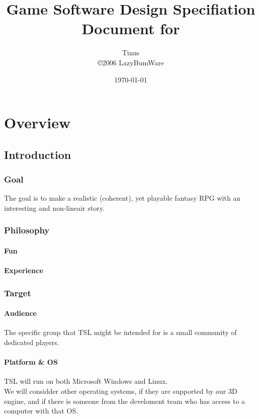 \documentclass[a4paper]{report}
\title{
	Game Software Design Specifiation Document for \\ 
	\nadruk{The Scattered Lands}
}
\author{
	Tinus \\
	\copyright 2006 LazyBumWare
}
\date{\today}
\begin{document}
\maketitle
\tableofcontents

\part{Overview}

	\chapter{Introduction}

		\section{Goal}

			The goal is to make a realistic (coherent), yet playable fantasy RPG with an interesting and non-lineair story.

		\section{Philosophy}

			\subsection{Fun}

			\subsection{Experience}

		\section{Target}

			\subsection{Audience}

				The specific group that TSL might be intended for is a small community of dedicated players.

			\subsection{Platform \& OS}

			TSL will run on both Microsoft Windows and Linux. \\
			We will considder other operating systems, if they are supported by our 3D engine, and if there is someone from the develoment team who has access to a computer with that OS.
\end{document}
